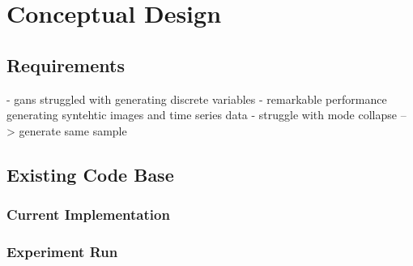 \chapter{Conceptual Design}
\label{ch:conceptualDesign}

\section{Requirements}
\label{ch:conceptualDesign-requirements}



- gans struggled with generating discrete variables \cite{torfi2020CorGANCorrelationCapturingConvolutionala}
- remarkable performance generating syntehtic images and time series data \cite{mckeever2020SynthesisingTabularDatasets}
- struggle with mode collapse --> generate same sample \cite{torfi2020CorGANCorrelationCapturingConvolutionala}

\section{Existing Code Base}
\label{ch:conceptualDesign-existingCodeBase}

\subsection{Current Implementation}
\label{ch:conceptualDesign-existingCodeBase-currentImplementation}

\subsection{Experiment Run}
\label{ch:conceptualDesign-existingCodeBase-experimentRun}

